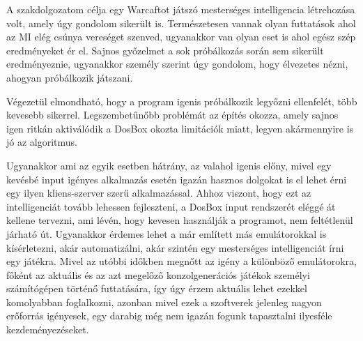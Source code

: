 
A szakdolgozatom célja egy Warcaftot játszó mesterséges intelligencia létrehozása volt, amely úgy gondolom sikerült is. Természetesen vannak olyan futtatások ahol az MI elég csúnya vereséget szenved, ugyanakkor van olyan eset is ahol egész szép eredményeket ér el. Sajnos győzelmet a sok próbálkozás során sem sikerült eredményeznie, ugyanakkor személy szerint úgy gondolom, hogy élvezetes nézni, ahogyan próbálkozik játszani. 

Végezetül elmondható, hogy a program igenis próbálkozik legyőzni ellenfelét, több kevesebb sikerrel. Legszembetűnőbb problémát az építés okozza, amely sajnos igen ritkán aktiválódik a DosBox okozta limitációk miatt, legyen akármennyire is jó az algoritmus.

Ugyanakkor ami az egyik esetben hátrány, az valahol igenis előny, mivel egy kevésbé input igényes alkalmazás esetén igazán hasznos dolgokat is el lehet érni egy ilyen kliens-szerver szerű alkalmazással.
Ahhoz viszont, hogy ezt az intelligenciát tovább lehessen fejleszteni, a DosBox input rendszerét eléggé át kellene tervezni, ami lévén, hogy kevesen használják a programot, nem feltétlenül járható út. Ugyanakkor érdemes lehet a már említett más emulátorokkal is kísérletezni, akár automatizálni, akár szintén egy mesterséges intelligenciát írni egy játékra. Mivel az utóbbi időkben megnőtt az igény a különböző emulátorokra, főként az aktuális és az azt megelőző konzolgenerációs játékok személyi számítógépen történő futtatására, így úgy érzem aktuális lehet ezekkel komolyabban foglalkozni, azonban mivel ezek a szoftverek jelenleg nagyon erőforrás igényesek, egy darabig még nem igazán fogunk tapasztalni ilyesféle kezdeményezéseket.

